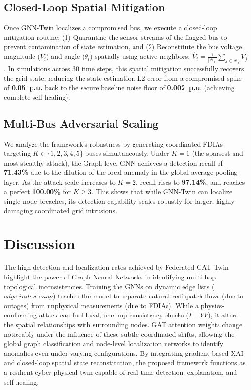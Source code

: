 \documentclass[10pt, a4paper, twocolumn]{article}
\begin{document}
\subsection{Closed-Loop Spatial Mitigation}
Once GNN-Twin localizes a compromised bus, we execute a closed-loop mitigation routine: (1) Quarantine the sensor streams of the flagged bus to prevent contamination of state estimation, and (2) Reconstitute the bus voltage magnitude ($V_i$) and angle ($\theta_i$) spatially using active neighbors: $\hat{V}_i = \frac{1}{|\mathcal{N}_i|} \sum_{j \in \mathcal{N}_i} V_j$. In simulations across 30 time steps, this spatial mitigation successfully recovers the grid state, reducing the state estimation L2 error from a compromised spike of \textbf{0.05~p.u.} back to the secure baseline noise floor of \textbf{0.002~p.u.} (achieving complete self-healing).

\subsection{Multi-Bus Adversarial Scaling}
We analyze the framework's robustness by generating coordinated FDIAs targeting $K \in \{1, 2, 3, 4, 5\}$ buses simultaneously. Under $K=1$ (the sparsest and most stealthy attack), the Graph-level GNN achieves a detection recall of \textbf{71.43\%} due to the dilution of the local anomaly in the global average pooling layer. As the attack scale increases to $K=2$, recall rises to \textbf{97.14\%}, and reaches a perfect \textbf{100.00\%} for $K \geq 3$. This shows that while GNN-Twin can localize single-node breaches, its detection capability scales robustly for larger, highly damaging coordinated grid intrusions.

\section{Discussion}
The high detection and localization rates achieved by Federated GAT-Twin highlight the power of Graph Neural Networks in identifying multi-hop topological inconsistencies. Training the GNNs on dynamic edge lists ($edge\_index\_snap$) teaches the model to separate natural redispatch flows (due to outages) from unphysical measurements (due to FDIAs). While a physics-conforming attack can fool local, one-hop consistency checks ($I - YV$), it alters the spatial relationships with surrounding nodes. GAT attention weights change noticeably under the influence of these subtle coordinated shifts, allowing the global graph classification and node-level localization networks to identify anomalies even under varying configurations. By integrating gradient-based XAI and closed-loop spatial state reconstitution, the proposed framework functions as a resilient cyber-physical twin capable of real-time detection, explanation, and self-healing.
\end{document}
